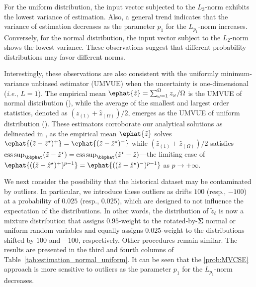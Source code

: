 \documentclass[opre, blindrev]{informs4}
\newcommand{\1}[1]{\mathds{1}{\left(#1\right)}}
\begin{document}
For the uniform distribution, the input vector subjected to the $L_3$-norm exhibits the lowest variance of estimation. Also, a general trend indicates that the variance of estimation decreases as the parameter $p_1$ for the $L_{p_1}$-norm increases. Conversely, for the normal distribution, the input vector subject to the $L_2$-norm shows the lowest variance. These observations suggest that different probability distributions may favor different norms. 

Interestingly, these observations are also consistent with the uniformly minimum-variance unbiased estimator (UMVUE) when the uncertainty is one-dimensional (\textit{i.e.}, $L = 1$). The empirical mean $\ephat{\tilde{z}} =  \sum_{\omega = 1}^\Omega z_\omega/\Omega$ is the UMVUE of normal distribution (\citealt{rohatgi2015introduction}), while the average of the smallest and largest order statistics, denoted as $(\hat z_{(1)} + \hat{z}_{(\Omega)})/2$, emerges as the UMVUE of uniform distribution (\citealt{bar1985minimum}). 
These estimators corroborate our analytical solutions as delineated in , as the empirical mean $\ephat{\tilde z}$ solves $\ephat{(\tilde{z} -\hat{z}^\star )^+} = \ephat{(\tilde{z} - \hat{z}^\star )^-}$ while $(\hat{z}_{(1)} + \hat{z}_{(\Omega)})/2$ satisfies $\operatorname*{ess\,sup}_{\bbphat}(\tilde{z} - \hat{z}^\star ) = \operatorname*{ess\,sup}_{\bbphat} ( \hat{z}^\star - \tilde{z})$---the limiting case of $\ephat{((\tilde z - \hat z^\star)^{+})^{p-1}} = \ephat{((\tilde z - \hat z^\star)^{-})^{p-1}}$ as $p \to +\infty$.

We next consider the possibility that the historical dataset may be contaminated by outliers. In particular, we introduce these outliers as drifts $100$ (resp., $-100$) at a probability of $0.025$ (resp., $0.025$), which are designed to not influence the expectation of the distributions. In other words, the distribution of $\tilde z_\ell$ is now a mixture distribution that assigns $0.95$-weight to the rotated-by-$\bm \Sigma$ normal or uniform random variables and equally assigns $0.025$-weight to the distributions shifted by $100$ and $-100$, respectively. Other procedures remain similar. The results are presented in the third and fourth columns of Table~\ref{tab:estimation_normal_uniform}. It can be seen that the \ref{prob:MVCSE} approach is more sensitive to outliers as the parameter $p_1$ for the $L_{p_1}$-norm decreases.
\end{document}
